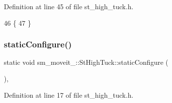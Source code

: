 Definition at line 45 of file st\+\_\+high\+\_\+tuck.\+h.


\begin{DoxyCode}
46     \{
47     \}
\end{DoxyCode}
\mbox{\label{structsm__moveit__3_1_1StHighTuck_aec8c3461ff25307361fed9e292e2a00d}} 
\subsubsection{\texorpdfstring{static\+Configure()}{staticConfigure()}}
{\footnotesize\ttfamily static void sm\+\_\+moveit\+\_\+::\+St\+High\+Tuck\+::static\+Configure (\begin{DoxyParamCaption}{ }\end{DoxyParamCaption})\hspace{0.3cm}{\ttfamily [inline]}, {\ttfamily [static]}}



Definition at line 17 of file st\+\_\+high\+\_\+tuck.\+h.


